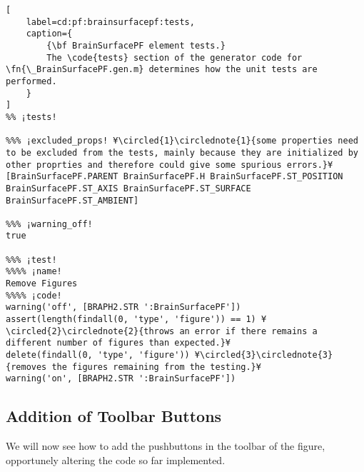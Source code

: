 \documentclass{tufte-handout}
\begin{document}
\begin{lstlisting}[
	label=cd:pf:brainsurfacepf:tests,
	caption={
		{\bf BrainSurfacePF element tests.}
		The \code{tests} section of the generator code for \fn{\_BrainSurfacePF.gen.m} determines how the unit tests are performed.
	}
]
%% ¡tests!

%%% ¡excluded_props! ¥\circled{1}\circlednote{1}{some properties need to be excluded from the tests, mainly because they are initialized by other proprties and therefore could give some spurious errors.}¥
[BrainSurfacePF.PARENT BrainSurfacePF.H BrainSurfacePF.ST_POSITION BrainSurfacePF.ST_AXIS BrainSurfacePF.ST_SURFACE BrainSurfacePF.ST_AMBIENT]

%%% ¡warning_off!
true

%%% ¡test!
%%%% ¡name!
Remove Figures
%%%% ¡code!
warning('off', [BRAPH2.STR ':BrainSurfacePF'])
assert(length(findall(0, 'type', 'figure')) == 1) ¥\circled{2}\circlednote{2}{throws an error if there remains a different number of figures than expected.}¥
delete(findall(0, 'type', 'figure')) ¥\circled{3}\circlednote{3}{removes the figures remaining from the testing.}¥
warning('on', [BRAPH2.STR ':BrainSurfacePF'])
\end{lstlisting}

\subsection{Addition of Toolbar Buttons}

We will now see how to add the pushbuttons in the toolbar of the figure, opportunely altering the code so far implemented.
\end{document}
